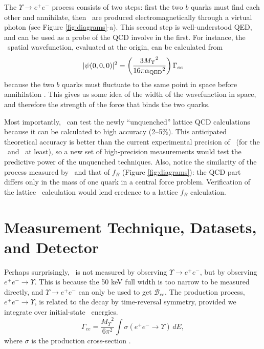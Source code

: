 \documentclass[aps,prd,preprint,superscriptaddress,tightenlines,nofootinbib,floatfix]{revtex4}
\begin{document}
The $\Upsilon \to e^+e^-$ process consists of two steps: first the two
$b$ quarks must find each other and annihilate, then \ee\ are produced
electromagnetically through a virtual photon (see Figure
\ref{fig:diagrams}-a).  This second step is well-understood QED, and
can be used as a probe of the QCD involve in the first.  For instance,
the \bbar\ spatial wavefunction, evaluated at the origin, can be
calculated from
\begin{equation}
  |\psi(0,0,0)|^2 = \left(\frac{3 {M_\Upsilon}^2}{16 \pi
   {\alpha_{\mbox{\scriptsize QED}}}^2} \right) \Gamma_{ee} \label{eqn:psi000}
\end{equation}
because the two $b$ quarks must fluctuate to the same point in space
before annihilation \cite{ps}.  This gives us some idea of the width
of the wavefunction in space, and therefore the strength of the force
that binds the two quarks.

Most importantly, \gee\ can test the newly ``unquenched'' lattice QCD
calculations \cite{davies} because it can be calculated to high
accuracy (2--5\%).  This anticipated theoretical accuracy is better
than the current experimental precision of \gee\ (for the \utwo\ and
\uthree\ at least), so a new set of high-precision measurements would
test the predictive power of the unquenched techniques.  Also, notice
the similarity of the process measured by \gee\ and that of $f_B$
(Figure \ref{fig:diagrams}): the QCD part differs only in the mass of
one quark in a central force problem.  Verification of the lattice
\gee\ calculation would lend credence to a lattice $f_B$ calculation.

%
\section{Measurement Technique, Datasets, and Detector}
%

Perhaps surprisingly, \gee\ is not measured by observing $\Upsilon \to
e^+e^-$, but by observing $e^+e^- \to \Upsilon$.  This is because the
50 keV full width is too narrow to be measured directly, and $\Upsilon
\to e^+e^-$ can only be used to get $\mathcal{B}_{ee}$.  The
production process, $e^+e^- \to \Upsilon$, is related to the decay by
time-reversal symmetry, provided we integrate over initial-state \ee\
energies.
\begin{equation}
  \Gamma_{ee} = \frac{{M_\Upsilon}^2}{6\pi^2} \int \sigma(e^+e^- \to
  \Upsilon) \, dE, \label{eqn:geesig}
\end{equation}
where $\sigma$ is the production cross-section \cite{pdg} \cite{ps}.
\end{document}
